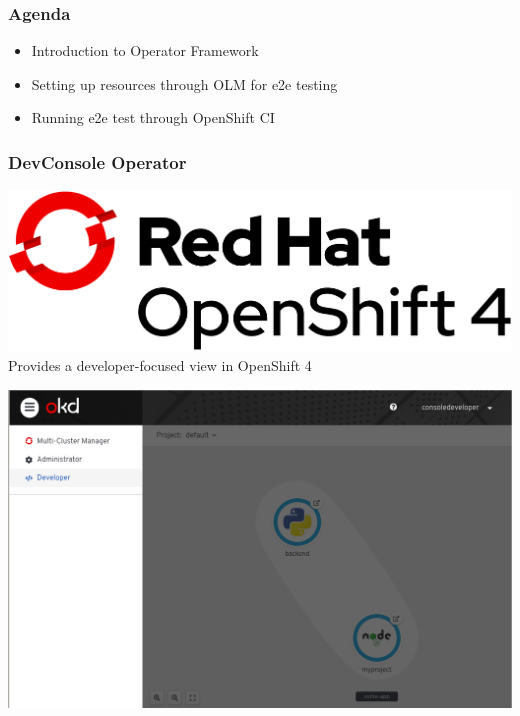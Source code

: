 \documentclass[aspectratio=169]{beamer}
\begin{document}
\begin{frame}
  \frametitle{Agenda}

  \begin{itemize}
  \item Introduction to Operator Framework
  \item Setting up resources through OLM for e2e testing
  \item Running e2e test through OpenShift CI
  \end{itemize}

\end{frame}

\begin{frame}
  \frametitle{DevConsole Operator}

  \includegraphics[scale=.15]{images/Logo-Red_Hat-OpenShift_4-A-Standard-RGB.png}\\[.25in]

  Provides a developer-focused view in OpenShift 4

\end{frame}

\begin{frame}

  \includegraphics[scale=.25]{images/devconsole.png}

\end{frame}
\end{document}
